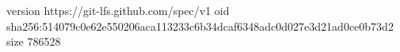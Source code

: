 version https://git-lfs.github.com/spec/v1
oid sha256:514079c0e62e550206aca113233c6b34dcaf6348adc0d027e3d21ad0ce0b73d2
size 786528
